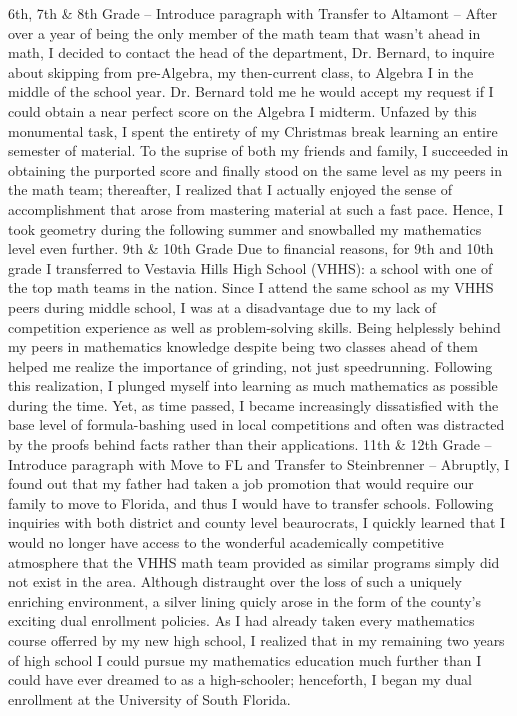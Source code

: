 \documentclass[12pt]{article}
\begin{document}
\begin{outline}[enumerate]
  \1 6th, 7th \& 8th Grade
    \2 -- Introduce paragraph with Transfer to Altamont -- %
    \2 After over a year of being the only member of the math team that wasn't ahead in math, I decided to contact the head of the department, Dr. Bernard, to inquire about skipping from pre-Algebra, my then-current class, to Algebra I in the middle of the school year.
    \2 Dr. Bernard told me he would accept my request if I could obtain a near perfect score on the Algebra I midterm. Unfazed by this monumental task, I spent the entirety of my Christmas break learning an entire semester of material. To the suprise of both my friends and family, I succeeded in obtaining the purported score and finally stood on the same level as my peers in the math team; thereafter, I realized that I actually enjoyed the sense of accomplishment that arose from mastering material at such a fast pace. Hence, I took geometry during the following summer and snowballed my mathematics level even further.
  \1 9th \& 10th Grade
    \2 Due to financial reasons, for 9th and 10th grade I transferred to Vestavia Hills High School (VHHS): a school with one of the top math teams in the nation. Since I attend the same school as my VHHS peers during middle school, I was at a disadvantage due to my lack of competition experience as well as problem-solving skills. Being helplessly behind my peers in mathematics knowledge despite being two classes ahead of them helped me realize the importance of grinding, not just speedrunning. Following this realization, I plunged myself into learning as much mathematics as possible during the time. Yet, as time passed, I became increasingly dissatisfied with the base level of formula-bashing used in local competitions and often was distracted by the proofs behind facts rather than their applications.
  \1 11th \& 12th Grade
    \2 -- Introduce paragraph with Move to FL and Transfer to Steinbrenner -- %
      \3 Abruptly, I found out that my father had taken a job promotion that would require our family to move to Florida, and thus I would have to transfer schools. Following inquiries with both district and county level beaurocrats, I quickly learned that I would no longer have access to the wonderful academically competitive atmosphere that the VHHS math team provided as similar programs simply did not exist in the area.
      \3 Although distraught over the loss of such a uniquely enriching environment, a silver lining quicly arose in the form of the county's exciting dual enrollment policies. As I had already taken every mathematics course offerred by my new high school, I realized that in my remaining two years of high school I could pursue my mathematics education much further than I could have ever dreamed to as a high-schooler; henceforth, I began my dual enrollment at the University of South Florida.

\end{outline}
\end{document}
